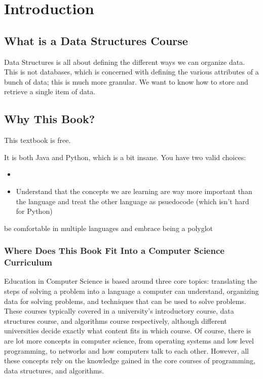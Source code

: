 
\chapter{Introduction}

\section{What is a Data Structures Course}
Data Structures is all about defining the different ways we can organize data.  This is not databases, which is concerned with defining the various attributes of a bunch of data;  this is much more granular.  We want to know how to store and retrieve a single item of data.


\section{Why This Book?}

This textbook is free.

It is both Java and Python, which is a bit insane.  You have two valid choices: 
\begin{itemize}
	\item 
	\item Understand that the concepts we are learning are way more important than the language and treat the other language as psuedocode (which isn't hard for Python)
	
\end{itemize}
be comfortable in multiple languages and embrace being a polyglot


\subsection{Where Does This Book Fit Into a Computer Science Curriculum }

Education in Computer Science is based around three core topics: translating the steps of solving a problem into a language a computer can understand, organizing data for solving problems, and techniques that can be used to solve problems. %
These courses typically covered in a university's introductory course, data structures course, and algorithms course respectively, although different universities decide exactly what content fits in which course.
Of course, there is are lot more concepts in computer science, from operating systems and low level programming,  to networks and how computers talk to each other. However, all these concepts rely on the knowledge gained in the core courses of programming, data structures, and algorithms.



